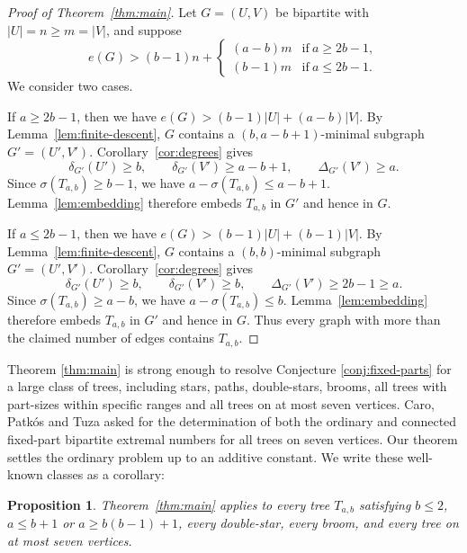 \documentclass[12pt]{article}
\newtheorem{proposition}[theorem]{Proposition}
\theoremstyle{definition}
\theoremstyle{remark}
\begin{document}
\begin{proof}[Proof of Theorem~\ref{thm:main}]
Let $G=(U,V)$ be bipartite with $|U|=n\ge m=|V|$, and suppose
\[
    e(G)>
    (b-1)n+\begin{cases}
    (a-b)m&\text{if}\ a\geq2b-1,\\
    (b-1)m&\text{if}\ a\leq2b-1.
    \end{cases}
\]
We consider two cases.

If $a\geq2b-1$, then we have $ e(G)>(b-1)|U|+(a-b)|V|.$ By Lemma~\ref{lem:finite-descent}, $G$ contains a $(b,a-b+1)$-minimal subgraph $G'=(U',V')$. Corollary~\ref{cor:degrees} gives
\[
    \delta_{G'}(U')\ge b,
    \qquad
    \delta_{G'}(V')\ge a-b+1,
    \qquad
    \Delta_{G'}(V')\ge a.
\]
Since $\sigma(T_{a,b})\ge b-1$, we have $a-\sigma(T_{a,b})\le a-b+1$.
Lemma~\ref{lem:embedding} therefore embeds $T_{a,b}$ in $G'$ and hence in $G$.

If $a\leq2b-1$, then we have $ e(G)>(b-1)|U|+(b-1)|V|.$ By Lemma~\ref{lem:finite-descent}, $G$ contains a $(b,b)$-minimal subgraph $G'=(U',V')$. Corollary~\ref{cor:degrees} gives
\[
    \delta_{G'}(U')\ge b,
    \qquad
    \delta_{G'}(V')\ge b,
    \qquad
    \Delta_{G'}(V')\ge 2b-1\geq a.
\]
Since $\sigma(T_{a,b})\ge a-b$, we have $a-\sigma(T_{a,b})\le b$.
Lemma~\ref{lem:embedding} therefore embeds $T_{a,b}$ in $G'$ and hence in $G$. Thus every graph with more than the claimed number of edges contains $T_{a,b}$.
\end{proof}

Theorem \ref{thm:main} is strong enough to resolve Conjecture \ref{conj:fixed-parts} for a large class of trees, including stars, paths, double-stars, brooms, all trees with part-sizes within specific ranges and all trees on at most seven vertices. Caro, Patk\'os and Tuza asked for the determination of both the ordinary and connected fixed-part bipartite extremal numbers for all trees on seven vertices. Our theorem settles the ordinary problem up to an additive constant. We write these well-known classes as a corollary:

\begin{proposition}
\label{prop:small-trees}
Theorem~\ref{thm:main} applies to every tree $T_{a,b}$ satisfying
$b\leq 2$, $a\leq b+1$ or $a\geq b(b-1)+1$, every double-star, every broom, and every tree on at most seven vertices.
\end{proposition}
\end{document}
